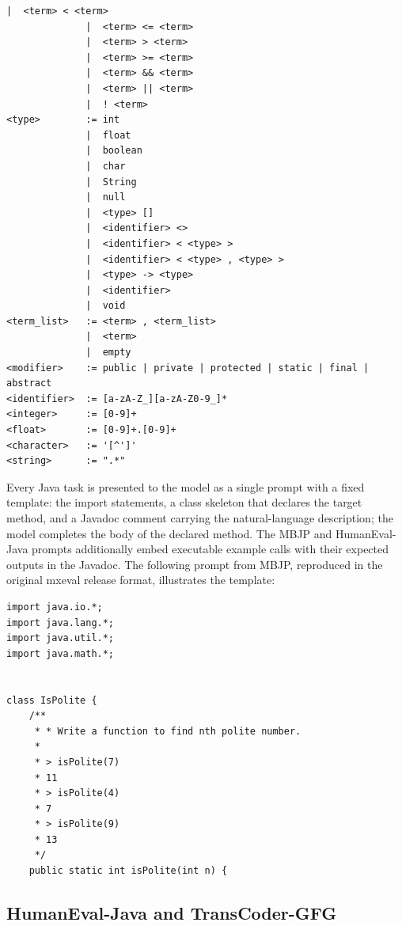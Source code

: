 \documentclass[manuscript,screen]{acmart}
\begin{document}
\begin{tcolorbox}[
    enhanced,
    breakable,
    colback=blue!5!white,
    colframe=blue!50!black,
    title=Java Subset Language Grammar,
    fonttitle=\bfseries,
    boxrule=1pt,
    arc=3pt
]
\begin{Verbatim}[fontsize=\small]
              |  <term> < <term>
              |  <term> <= <term>
              |  <term> > <term>
              |  <term> >= <term>
              |  <term> && <term>
              |  <term> || <term>
              |  ! <term>
<type>        := int
              |  float
              |  boolean
              |  char
              |  String
              |  null
              |  <type> []
              |  <identifier> <>
              |  <identifier> < <type> >
              |  <identifier> < <type> , <type> >
              |  <type> -> <type>
              |  <identifier>
              |  void
<term_list>   := <term> , <term_list>
              |  <term>
              |  empty
<modifier>    := public | private | protected | static | final | abstract
<identifier>  := [a-zA-Z_][a-zA-Z0-9_]*
<integer>     := [0-9]+
<float>       := [0-9]+.[0-9]+
<character>   := '[^']'
<string>      := ".*"
\end{Verbatim}
\end{tcolorbox}

 {\color{revblue}Every Java task is presented to the model as a single prompt with a fixed template: the import statements, a class skeleton that declares the target method, and a Javadoc comment carrying the natural-language description; the model completes the body of the declared method. The MBJP and HumanEval-Java prompts additionally embed executable example calls with their expected outputs in the Javadoc. The following prompt from MBJP, reproduced in the original mxeval release format, illustrates the template:
}

\begin{tcolorbox}[
    enhanced,
    breakable,
    colback=gray!5,
    colframe=black,
    boxrule=0.5pt,
    arc=2pt,
    left=8pt,
    right=8pt,
    top=8pt,
    bottom=8pt,
    title=Example Java Prompt (MBJP)
]
\begin{Verbatim}[fontsize=\small, xleftmargin=1em]
import java.io.*;
import java.lang.*;
import java.util.*;
import java.math.*;


class IsPolite {
    /**
     * * Write a function to find nth polite number.
     *
     * > isPolite(7)
     * 11
     * > isPolite(4)
     * 7
     * > isPolite(9)
     * 13
     */
    public static int isPolite(int n) {
\end{Verbatim}
\end{tcolorbox}

\subsection{{\color{revblue}HumanEval-Java and TransCoder-GFG}}
\end{document}
